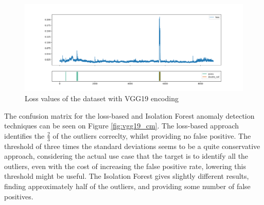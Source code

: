 \begin{figure}[!ht]
    \centering
    \includegraphics[width=\textwidth,trim={0 1cm 0 1cm},clip]{./results/vgg19_vgg19/20230510_172958_feature_vectors_loss.png}
    \caption{Loss values of the dataset with VGG19 encoding}
    \label{fig:vgg19_loss}
\end{figure}

The confusion matrix for the loss-based and Isolation Forest anomaly detection techniques can be seen
on Figure \ref{fig:vgg19_cm}.
The loss-based approach identifies the $\frac{2}{3}$ of the outliers correclty,
whilst providing no false positive.
The threshold of three times the standard deviations seems to be a quite conservative approach,
considering the actual use case that the target is to identify all the outliers, even with the cost
of increasing the false positive rate, lowering this threshold might be useful.
The Isolation Forest gives slightly different results, finding approximately half of the outliers,
and providing some number of false positives.


